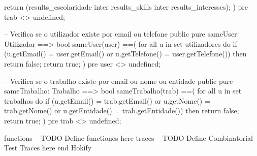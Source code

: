 \begin{vdmpp}[breaklines=true]
  return (results_escolaridade inter results_skills inter results_interesses);
 )
 pre trab <> undefined;
 
 -- Verifica se o utilizador existe por email ou telefone
 public pure sameUser: Utilizador ==> bool
 sameUser(user) ==(
  for all u in set utilizadores do
   if (u.getEmail() = user.getEmail() or 
     u.getTelefone() = user.getTelefone()) then
    return false;
  return true;
 )
 pre user <> undefined;
 
 -- Verifica se o trabalho existe por email ou nome ou entidade
 public pure sameTrabalho: Trabalho ==> bool
 sameTrabalho(trab) ==(
  for all u in set trabalhos do
   if (u.getEmail() = trab.getEmail() or 
     u.getNome() = trab.getNome() or 
     u.getEntidade() = trab.getEntidade()) then
    return false;
  return true;
 )
 pre trab <> undefined;
 
functions
-- TODO Define functiones here
traces
-- TODO Define Combinatorial Test Traces here
end Hokify
\end{vdmpp}
\bigskip
